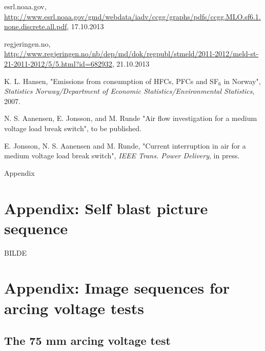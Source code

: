 \documentclass[10pt,b5paper,twoside]{article}
\begin{document}
\begin{thebibliography}{10}
 esrl.noaa.gov, \url{http://www.esrl.noaa.gov/gmd/webdata/iadv/ccgg/graphs/pdfs/ccgg.MLO.sf6.1.none.discrete.all.pdf}, 17.10.2013

 regjeringen.no, \url{http://www.regjeringen.no/nb/dep/md/dok/regpubl/stmeld/2011-2012/meld-st-21-2011-2012/5/5.html?id=682932}, 21.10.2013

 K. L. Hansen, "Emissions from consumption of HFCs, PFCs and SF$_6$ in Norway", \textit{Statistics Norway/Department of Economic Statistics/Environmental Statistics}, 2007.

 N. S. Aanensen, E. Jonsson, and M. Runde "Air flow investigation for a medium voltage load break switch", to be published.

 E. Jonsson, N. S. Aanensen and M. Runde, "Current interruption in air for a medium voltage load break switch", \textit{IEEE Trans. Power Delivery}, in press.

\end{thebibliography}

\cleardoublepage
\appendix
\vspace*{\fill}
\begingroup
\begin{center}
\huge Appendix
\end{center}
\endgroup
\vspace*{\fill}
\cleardoublepage
\section{Appendix: Self blast picture sequence} \label{app:SelfBlast}
\setcounter{figure}{0}
\makeatletter 
\renewcommand{\thefigure}{A.\@arabic\c@figure}
\makeatother

\setcounter{table}{0}
\makeatletter 
\renewcommand{\thetable}{A.\@arabic\c@table}
\makeatother

BILDE

\newpage



\cleardoublepage
\section{Appendix: Image sequences for arcing voltage tests} \label{app:ImageSequences}
\makeatletter 
\renewcommand{\thefigure}{B.\@arabic\c@figure}
\makeatother

\makeatletter 
\renewcommand{\thetable}{B.\@arabic\c@table}
\makeatother

\subsection{The 75 mm arcing voltage test} \label{app:pictureSeq75mm}
\end{document}

